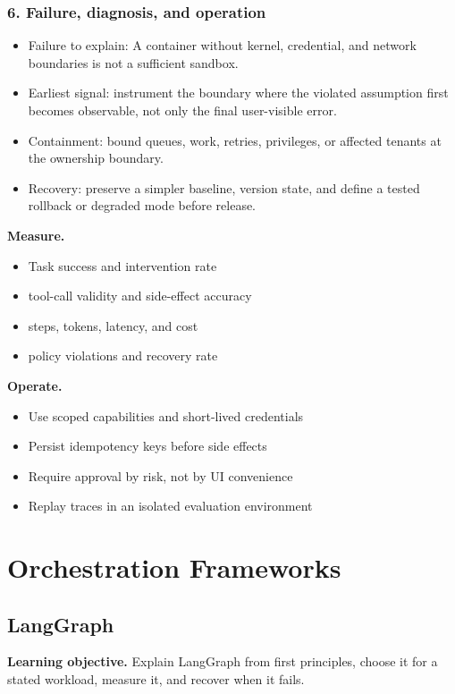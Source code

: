 \subsubsection*{6. Failure, diagnosis, and operation}
\begin{itemize}
\item Failure to explain: A container without kernel, credential, and network boundaries is not a sufficient sandbox.
\item Earliest signal: instrument the boundary where the violated assumption first becomes observable, not only the final user-visible error.
\item Containment: bound queues, work, retries, privileges, or affected tenants at the ownership boundary.
\item Recovery: preserve a simpler baseline, version state, and define a tested rollback or degraded mode before release.
\end{itemize}
\textbf{Measure.}\begin{itemize}
\item Task success and intervention rate
\item tool-call validity and side-effect accuracy
\item steps, tokens, latency, and cost
\item policy violations and recovery rate
\end{itemize}
\textbf{Operate.}\begin{itemize}
\item Use scoped capabilities and short-lived credentials
\item Persist idempotency keys before side effects
\item Require approval by risk, not by UI convenience
\item Replay traces in an isolated evaluation environment
\end{itemize}
\clearpage\section{Orchestration Frameworks}
\subsection{LangGraph}
\textbf{Learning objective.} Explain LangGraph from first principles, choose it for a stated workload, measure it, and recover when it fails.
